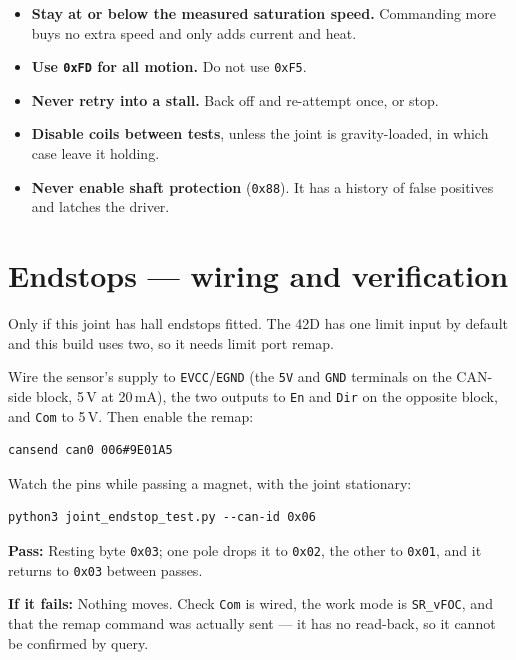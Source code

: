 \documentclass[11pt,letterpaper]{article}
\newcommand{\passif}[1]{\par\vspace{2pt}\noindent\textbf{\color{okgreen}Pass:} #1\par\vspace{4pt}}
\newcommand{\failif}[1]{\noindent\textbf{If it fails:} #1\par\vspace{6pt}}
\begin{document}
\begin{itemize}[leftmargin=*]
    \item \textbf{Stay at or below the measured saturation speed.} Commanding more
          buys no extra speed and only adds current and heat.
    \item \textbf{Use \texttt{0xFD} for all motion.} Do not use \texttt{0xF5}.
    \item \textbf{Never retry into a stall.} Back off and re-attempt once, or stop.
    \item \textbf{Disable coils between tests}, unless the joint is gravity-loaded,
          in which case leave it holding.
    \item \textbf{Never enable shaft protection} (\texttt{0x88}). It has a history of
          false positives and latches the driver.
\end{itemize}

\section*{Endstops --- wiring and verification}

Only if this joint has hall endstops fitted. The 42D has one limit input by default
and this build uses two, so it needs limit port remap.

Wire the sensor's supply to \texttt{EVCC}/\texttt{EGND} (the \texttt{5V} and
\texttt{GND} terminals on the CAN-side block, 5\,V at 20\,mA), the two outputs to
\texttt{En} and \texttt{Dir} on the opposite block, and \texttt{Com} to 5\,V. Then
enable the remap:

\begin{lstlisting}
cansend can0 006#9E01A5
\end{lstlisting}

Watch the pins while passing a magnet, with the joint stationary:

\begin{lstlisting}
python3 joint_endstop_test.py --can-id 0x06
\end{lstlisting}

\passif{Resting byte \texttt{0x03}; one pole drops it to \texttt{0x02}, the other to
\texttt{0x01}, and it returns to \texttt{0x03} between passes.}
\failif{Nothing moves. Check \texttt{Com} is wired, the work mode is
\texttt{SR\_vFOC}, and that the remap command was actually sent --- it has no
read-back, so it cannot be confirmed by query.}
\end{document}
